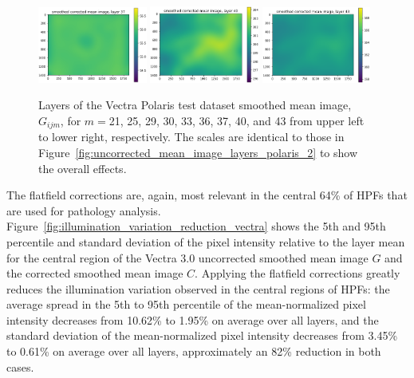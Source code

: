 \documentclass[letterpaper,11pt]{article}
\newcommand{\reffig}[1]{Figure~\ref{#1}}
\begin{document}
\begin{figure}[!ht]
\includegraphics[width=0.32\textwidth]{images/results/smoothed_corrected_mean_image_layers_polaris/smoothed_corrected_mean_image_layer_37_same_scale}
\includegraphics[width=0.32\textwidth]{images/results/smoothed_corrected_mean_image_layers_polaris/smoothed_corrected_mean_image_layer_40_same_scale}
\includegraphics[width=0.32\textwidth]{images/results/smoothed_corrected_mean_image_layers_polaris/smoothed_corrected_mean_image_layer_43_same_scale}
\caption{\footnotesize Layers of the Vectra Polaris test dataset smoothed mean image, $G_{ijm}$, for $m=$21, 25, 29, 30, 33, 36, 37, 40, and 43 from upper left to lower right, respectively. The scales are identical to those in \reffig{fig:uncorrected_mean_image_layers_polaris_2} to show the overall effects.}
\label{fig:corrected_smoothed_mean_image_layers_same_scale_polaris_2}
\end{figure}

The flatfield corrections are, again, most relevant in the central 64\% of HPFs that are used for pathology analysis. \reffig{fig:illumination_variation_reduction_vectra} shows the 5th and 95th percentile and standard deviation of the pixel intensity relative to the layer mean for the central region of the Vectra 3.0 uncorrected smoothed mean image $G$ and the corrected smoothed mean image $C$. Applying the flatfield corrections greatly reduces the illumination variation observed in the central regions of HPFs: the average spread in the 5th to 95th percentile of the mean-normalized pixel intensity decreases from 10.62\% to 1.95\% on average over all layers, and the standard deviation of the mean-normalized pixel intensity decreases from 3.45\% to 0.61\% on average over all layers, approximately an 82\% reduction in both cases.
\end{document}
